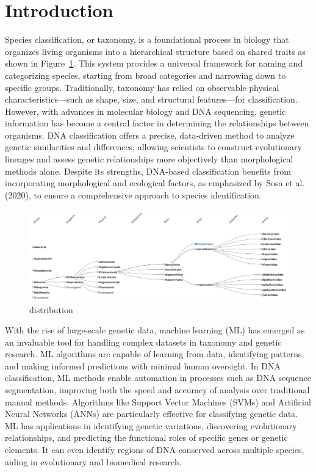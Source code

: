 \section{Introduction}
Species classification, or taxonomy, is a foundational process in biology that organizes living organisms into a hierarchical structure based on shared traits as shown in Figure~\ref{fig:IVT}. This system provides a universal framework for naming and categorizing species, starting from broad categories and narrowing down to specific groups. Traditionally, taxonomy has relied on observable physical characteristics—such as shape, size, and structural features—for classification. However, with advances in molecular biology and DNA sequencing, genetic information has become a central factor in determining the relationships between organisms. DNA classification offers a precise, data-driven method to analyze genetic similarities and differences, allowing scientists to construct evolutionary lineages and assess genetic relationships more objectively than morphological methods alone. Despite its strengths, DNA-based classification benefits from incorporating morphological and ecological factors, as emphasized by Sosa et al. (2020), to ensure a comprehensive approach to species identification.

\begin{figure}[t]
\begin{centering}
		\includegraphics[width=\textwidth]{Figures/heirarchy_IVT.png}
	\caption{distribution  }
\label{fig:IVT}
\end{centering}
\end{figure}


With the rise of large-scale genetic data, machine learning (ML) has emerged as an invaluable tool for handling complex datasets in taxonomy and genetic research. ML algorithms are capable of learning from data, identifying patterns, and making informed predictions with minimal human oversight. In DNA classification, ML methods enable automation in processes such as DNA sequence segmentation, improving both the speed and accuracy of analysis over traditional manual methods. Algorithms like Support Vector Machines (SVMs) and Artificial Neural Networks (ANNs) are particularly effective for classifying genetic data. ML has applications in identifying genetic variations, discovering evolutionary relationships, and predicting the functional roles of specific genes or genetic elements. It can even identify regions of DNA conserved across multiple species, aiding in evolutionary and biomedical research.


